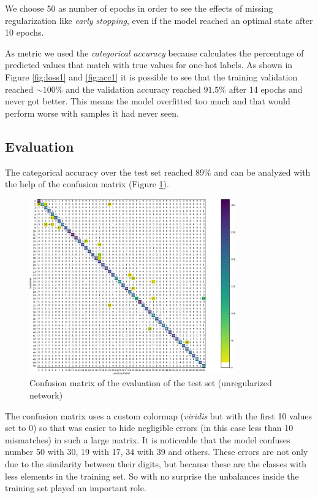 \documentclass[compsoc]{IEEEtran}
\begin{document}
We choose 50 as number of epochs in order to see the effects of missing regularization like \emph{early stopping}, 
even if the model reached an optimal state after 10 epochs. \par
As metric we used the \emph{categorical accuracy} because calculates the percentage of predicted values that match with true values for one-hot labels.
As shown in Figure \ref{fig:loss1} and \ref{fig:acc1} it is possible to see that the training validation reached $\sim100\%$ 
and the validation accuracy reached $91.5\%$ after 14 epochs and never got better. This means the model
overfitted too much and that would perform worse with samples it had never seen. \par


\subsection{Evaluation}

The categorical accuracy 
over the test set reached $89\%$ and can be analyzed with the help of the confusion matrix (Figure \ref{fig:noregcm}). 

\begin{figure}[ht!]
\centering                                                                        
\includegraphics[width=3.5in]{noregcm.png}
\captionsetup{justification=centering}                                                                                 
\caption{Confusion matrix of the evaluation of the test set (unregularized network)}
\label{fig:noregcm}                                                                                                                        
\end{figure}
The confusion matrix uses a custom colormap (\emph{viridis} but with the first 10 values set to 0) so that was easier
to hide negligible errors (in this case less than 10 mismatches) in such a large matrix. It is noticeable that the model confuses number 50 with 30,
19 with 17, 34 with 39 and others. These errors are not only due to the similarity between their digits, but because
these are the classes with less elements in the training set. So with no surprise the unbalances inside the training set played an
important role.\par
\end{document}
